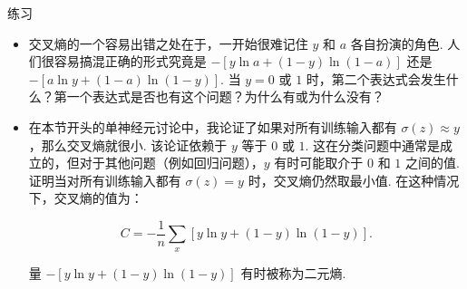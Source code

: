 \begin{exerciseBox}{练习}

\begin{itemize}

\item 交叉熵的一个容易出错之处在于，一开始很难记住 $y$ 和 $a$ 各自扮演的角色. 人们很容易搞混正确的形式究竟是 $-[y \ln a + (1-y) \ln (1-a)]$ 还是 $-[a \ln y + (1-a) \ln (1-y)]$. 当 $y = 0$ 或 $1$ 时，第二个表达式会发生什么？第一个表达式是否也有这个问题？为什么有或为什么没有？

\item
在本节开头的单神经元讨论中，我论证了如果对所有训练输入都有 $\sigma(z) \approx y$，那么交叉熵就很小. 该论证依赖于 $y$ 等于 $0$ 或 $1$. 这在分类问题中通常是成立的，但对于其他问题（例如回归问题），$y$ 有时可能取介于 $0$ 和 $1$ 之间的值. 证明当对所有训练输入都有 $\sigma(z) = y$ 时，交叉熵仍然取最小值. 在这种情况下，交叉熵的值为：

\begin{equation}
C = -\frac{1}{n} \sum_x [y \ln y+(1-y) \ln(1-y)].
\tag{64}
\end{equation}

量 $-[y \ln y+(1-y)\ln(1-y)]$ 有时被称为二元熵.

\end{itemize}

\end{exerciseBox}

